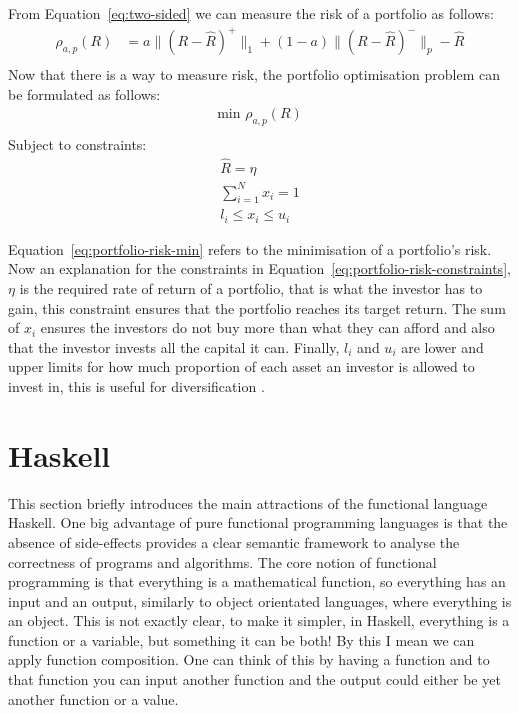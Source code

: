 \documentclass{pdfmx4020}
\begin{document}
  From Equation~\ref{eq:two-sided} we can measure the risk of a portfolio as follows:
  \begin{equation} \label{eq:portfolio-risk}
    \begin{split}
      \rho_{a,p}(R) & = a \|(R-\widehat{R})^+\|_1 + (1-a)\|(R-\widehat{R})^-\|_p - \widehat{R} \\
    \end{split}
  \end{equation} 
  Now that there is a way to measure risk, the portfolio optimisation problem can be formulated as follows:
  \begin{equation} \label{eq:portfolio-risk-min}
    \begin{split}
      \text{min } \rho_{a,p}(R) \\
    \end{split}
  \end{equation} 
  Subject to constraints:
  \begin{equation} \label{eq:portfolio-risk-constraints}
    \begin{split}
      \widehat{R} = \eta \\
      \sum\limits_{i=1}^N x_i = 1 \\
      l_i \leq x_i \leq u_i
    \end{split}
  \end{equation} 

  Equation~\ref{eq:portfolio-risk-min} refers to the minimisation of a portfolio's risk. Now an explanation for the constraints in Equation~\ref{eq:portfolio-risk-constraints}, $\eta$ is the required rate of return of a portfolio, that is what the investor has to gain, this constraint ensures that the portfolio reaches its target return. The sum of $x_i$ ensures the investors do not buy more than what they can afford and also that the investor invests all the capital it can. Finally, $l_i$ and $u_i$ are lower and upper limits for how much proportion of each asset an investor is allowed to invest in, this is useful for diversification \cite{diversification}. 

  
  \section{Haskell} %
  \label{sec:haskell}
  This section briefly introduces the main attractions of the functional language Haskell. One big advantage of pure functional programming languages is that the absence of side-effects provides a clear semantic framework to analyse the correctness of programs and algorithms. The core notion of functional programming is that everything is a mathematical function, so everything has an input and an output, similarly to object orientated languages, where everything is an object. This is not exactly clear, to make it simpler, in Haskell, everything is a function or a variable, but something it can be both! By this I mean we can apply function composition. One can think of this by having a function and to that function you can input another function and the output could either be yet another function or a value. 
\end{document}
